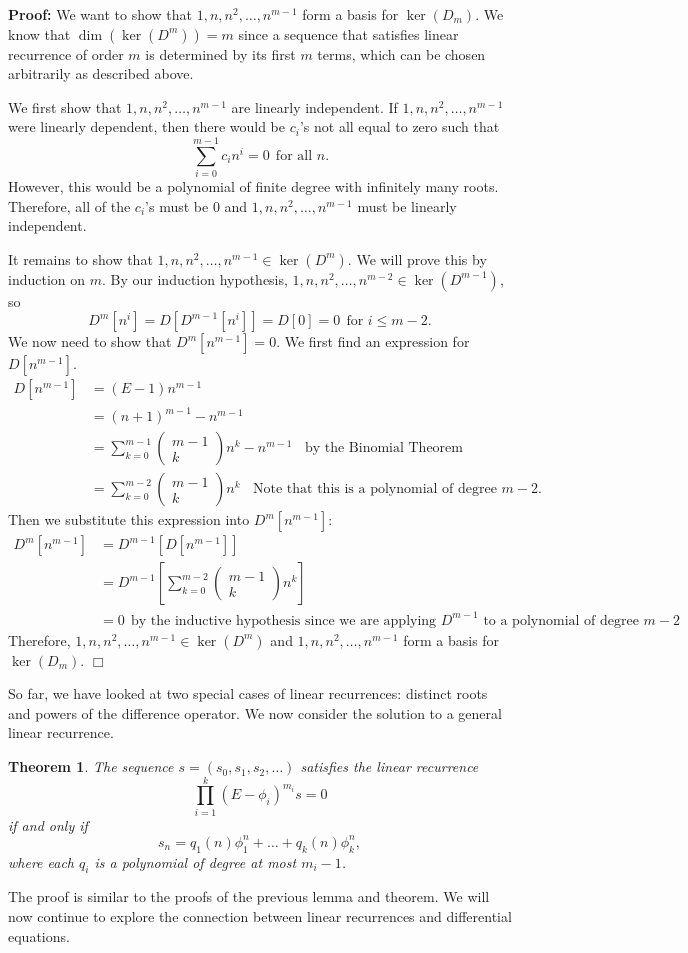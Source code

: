 \documentclass[11pt]{article}
\newtheorem{theorem}{Theorem}
\newenvironment{proof}{\noindent \textbf{Proof:}}{$\Box$}
\newcommand{\binomial}[2]{\left( \begin{array}{c} {#1} \\ 
                        {#2} \end{array} \right)} %
\begin{document}
\begin{proof}
We want to show that $1,n,n^2,\ldots,n^{m-1}$ form a basis for $\ker(D_m)$.  We know that $\dim(\ker(D^m)) = m$ since a sequence that satisfies linear recurrence of order $m$ is determined by its first $m$ terms, which can be chosen arbitrarily as described above.

We first show that $1,n,n^2,\ldots,n^{m-1}$ are linearly independent.  If $1,n,n^2,\ldots,n^{m-1}$ were linearly dependent, then there would be $c_i$'s not all equal to zero such that
$$\sum_{i=0}^{m-1}{c_in^i} = 0~~\text{for all $n$}.$$
However, this would be a polynomial of finite degree with infinitely many roots.  Therefore, all of the $c_i$'s must be 0 and $1,n,n^2,\ldots,n^{m-1}$ must be linearly independent.

It remains to show that $1,n,n^2,\ldots,n^{m-1} \in \ker(D^m)$.  We will prove this by induction on $m$.  By our induction hypothesis, $1,n,n^2,\ldots,n^{m-2} \in \ker(D^{m-1})$, so
$$D^m[n^i] = D[D^{m-1}[n^i]] = D[0] = 0~~\text{for $i \leq m-2$}.$$
We now need to show that $D^m[n^{m-1}] = 0$.  We first find an expression for $D[n^{m-1}]$.
$$
\begin{aligned}
D[n^{m-1}] &= (E-1)n^{m-1} \\
          &= (n+1)^{m-1} - n^{m-1} \\
          &= \sum_{k=0}^{m-1}{\binomial{m-1}{k}n^k} - n^{m-1}~~~~\text{by the Binomial Theorem}\\
          &= \sum_{k=0}^{m-2}{\binomial{m-1}{k}n^k}~~~~\text{Note that this is a polynomial of degree $m-2$.}
\end{aligned}
$$
Then we substitute this expression into $D^m[n^{m-1}]$:
$$
\begin{aligned}
D^m[n^{m-1}] &= D^{m-1}[D[n^{m-1}]] \\
            &= D^{m-1}\left[\sum_{k=0}^{m-2}{\binomial{m-1}{k}n^k}\right] \\
            &= 0~~\text{by the inductive hypothesis since we are applying $D^{m-1}$ to a polynomial of degree $m-2$}
\end{aligned}
$$
Therefore, $1,n,n^2,\ldots,n^{m-1} \in \ker(D^m)$ and $1,n,n^2,\ldots,n^{m-1}$ form a basis for $\ker(D_m)$.
\end{proof}

So far, we have looked at two special cases of linear recurrences: distinct roots and powers of the difference operator.  We now consider the solution to a general linear recurrence.

\begin{theorem}
The sequence $s = (s_0,s_1,s_2,\dots)$ satisfies the linear recurrence
$$\prod_{i=1}^k{(E-\phi_i)^{m_i}}s = 0$$
if and only if
$$s_n = q_1(n)\phi_1^n + \ldots + q_k(n)\phi_k^n,$$
where each $q_i$ is a polynomial of degree at most $m_i-1$.
\end{theorem}
The proof is similar to the proofs of the previous lemma and theorem.  We will now continue to explore the connection between linear recurrences and differential equations.
\end{document}
